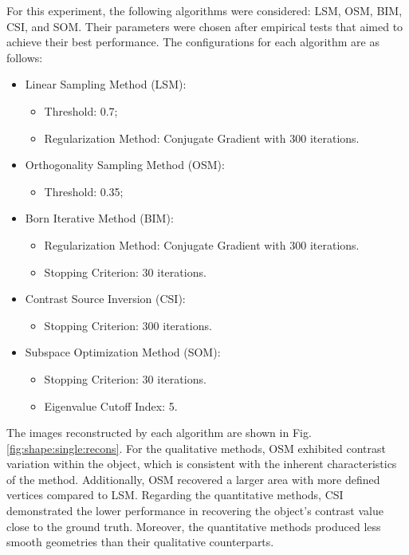 \documentclass{IEEEtran}
\begin{document}
                For this experiment, the following algorithms were considered: LSM, OSM, BIM, CSI, and SOM. Their parameters were chosen after empirical tests that aimed to achieve their best performance. The configurations for each algorithm are as follows:
                \begin{itemize}
                    \item Linear Sampling Method (LSM):
                    \begin{itemize}
                        \item Threshold: 0.7;
                        \item Regularization Method: Conjugate Gradient with 300 iterations.
                    \end{itemize}
                    \item Orthogonality Sampling Method (OSM):
                    \begin{itemize}
                        \item Threshold: 0.35;
                    \end{itemize}
                    \item Born Iterative Method (BIM):
                    \begin{itemize}
                        \item Regularization Method: Conjugate Gradient with 300 iterations.
                        \item Stopping Criterion: 30 iterations.
                    \end{itemize}
                    \item Contrast Source Inversion (CSI):
                    \begin{itemize}
                        \item Stopping Criterion: 300 iterations.
                    \end{itemize}
                    \item Subspace Optimization Method (SOM):
                    \begin{itemize}
                        \item Stopping Criterion: 30 iterations.
                        \item Eigenvalue Cutoff Index: 5.
                    \end{itemize}
                \end{itemize}

                The images reconstructed by each algorithm are shown in Fig. \ref{fig:shape:single:recons}. For the qualitative methods, OSM exhibited contrast variation within the object, which is consistent with the inherent characteristics of the method. Additionally, OSM recovered a larger area with more defined vertices compared to LSM. Regarding the quantitative methods, CSI demonstrated the lower performance in recovering the object's contrast value close to the ground truth. Moreover, the quantitative methods produced less smooth geometries than their qualitative counterparts.
\end{document}
